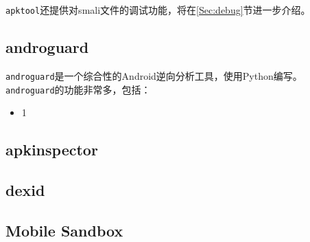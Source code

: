 \lstinline!apktool!还提供对smali文件的调试功能，将在\ref{Sec:debug}节进一步介绍。

\subsection{androguard}
\lstinline!androguard!\cite{url:androguard}是一个综合性的Android逆向分析工具，使用Python编写。\lstinline!androguard!的功能非常多，包括：
\begin{itemize}
  \item 1
\end{itemize}

\subsection{apkinspector}

\subsection{dexid}
\subsection{Mobile Sandbox}
